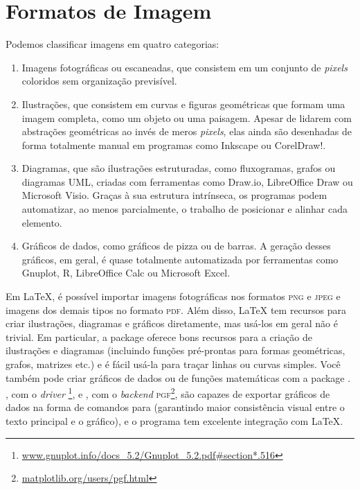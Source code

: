 \section{Formatos de Imagem}
\label{sec:graficos}

Podemos classificar imagens em quatro categorias:

\begin{enumerate}
    \item Imagens fotográficas ou escaneadas, que consistem em um conjunto
    de \emph{pixels} coloridos sem organização previsível.

    \item Ilustrações, que consistem em curvas e figuras geométricas
    que formam uma imagem completa, como um objeto ou uma paisagem.
    Apesar de lidarem com abstrações geométricas ao invés de meros
    \emph{pixels}, elas ainda são desenhadas de forma totalmente manual
    em programas como Inkscape ou CorelDraw!.

    \item Diagramas, que são ilustrações estruturadas, como fluxogramas,
    grafos ou diagramas UML, criadas com ferramentas como Draw.io,
    LibreOffice Draw ou Microsoft Visio. Graças à sua estrutura intrínseca,
    os programas podem automatizar, ao menos parcialmente, o trabalho de
    posicionar e alinhar cada elemento.

    \item Gráficos de dados, como gráficos de pizza ou de barras. A
    geração desses gráficos, em geral, é quase totalmente automatizada
    por ferramentas como Gnuplot, R, LibreOffice Calc ou Microsoft Excel.
\end{enumerate}

Em \LaTeX{}, é possível importar imagens fotográficas nos formatos
\textsc{png} e \textsc{jpeg} e imagens dos demais tipos no formato
\textsc{pdf}. Além disso, \LaTeX{} tem recursos para criar ilustrações,
diagramas e gráficos diretamente, mas usá-los em geral não é trivial.
Em particular, a package  oferece bons recursos para a
criação de ilustrações e diagramas (incluindo funções pré-prontas
para formas geométricas, grafos, matrizes etc.) e é fácil usá-la
para traçar linhas ou curvas simples. Você também pode criar gráficos
de dados ou de funções matemáticas com a package .
, com o \emph{driver} \footnote{
\url{www.gnuplot.info/docs\_5.2/Gnuplot\_5.2.pdf\#section*.516}}, e
, com o \emph{backend} \textsc{pgf}\footnote{
\url{matplotlib.org/users/pgf.html}}, são capazes de exportar gráficos
de dados na forma de comandos para  (garantindo maior
consistência visual entre o texto principal e o gráfico), e o programa
 tem excelente integração com \LaTeX{}.


